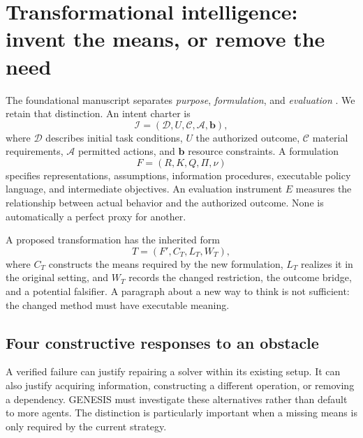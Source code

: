 \documentclass[11pt,letterpaper]{article}
\newcommand{\I}{\mathcal{I}}
\theoremstyle{remark}\newtheorem{remark}{Remark}[section]
\begin{document}
\section{Transformational intelligence: invent the means, or remove the need}
\label{sec:transform}
The foundational manuscript separates \emph{purpose}, \emph{formulation}, and \emph{evaluation} \citep{transform}. We retain that distinction. An intent charter is
\begin{equation}
\I=(\mathcal D,U,\mathcal C,\mathcal A,\mathbf b),
\end{equation}
where $\mathcal D$ describes initial task conditions, $U$ the authorized outcome, $\mathcal C$ material requirements, $\mathcal A$ permitted actions, and $\mathbf b$ resource constraints. A formulation
\begin{equation}
F=(R,K,Q,\Pi,\nu)
\end{equation}
specifies representations, assumptions, information procedures, executable policy language, and intermediate objectives. An evaluation instrument $E$ measures the relationship between actual behavior and the authorized outcome. None is automatically a perfect proxy for another.

A proposed transformation has the inherited form
\begin{equation}
T=(F',C_T,L_T,W_T),
\label{eq:transform}
\end{equation}
where $C_T$ constructs the means required by the new formulation, $L_T$ realizes it in the original setting, and $W_T$ records the changed restriction, the outcome bridge, and a potential falsifier. A paragraph about a new way to think is not sufficient: the changed method must have executable meaning.

\subsection{Four constructive responses to an obstacle}
A verified failure can justify repairing a solver within its existing setup. It can also justify acquiring information, constructing a different operation, or removing a dependency. GENESIS must investigate these alternatives rather than default to more agents. The distinction is particularly important when a missing means is only required by the current strategy.
\end{document}
